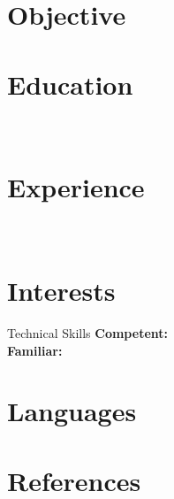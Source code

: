 \documentclass[margin]{res}
\begin{document}
\correspondence

\begin{resume}

	\section{Objective}{\objective}
	\section{Education}{\educations\\[-40pt]}
	\section{Experience}{\experiences\\[-40pt]}
	\section{Interests}{\interests}
	\begin{section}{Technical Skills}
		\textbf{Competent:} \competentskills\\
		\textbf{Familiar:} \familiarskills
	\end{section}
	\section{Languages}{\languages}
	\section{References}{}

\end{resume} 
\end{document}
